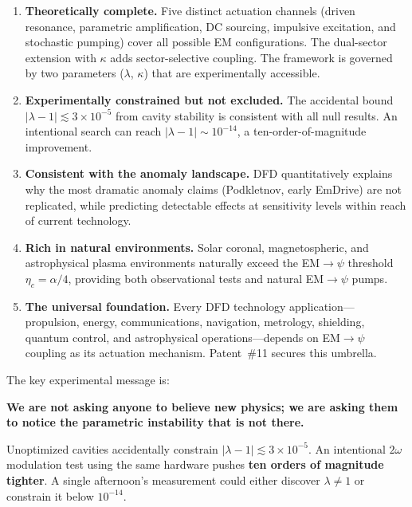 \documentclass[aps,prd,twocolumn,superscriptaddress,floatfix,nofootinbib]{revtex4-2}
\newcommand{\lam}{\lambda}
\begin{document}
\begin{enumerate}
\item \textbf{Theoretically complete.} Five distinct actuation
channels (driven resonance, parametric amplification, DC sourcing,
impulsive excitation, and stochastic pumping) cover all possible
EM configurations. The dual-sector extension with $\kappa$ adds
sector-selective coupling. The framework is governed by two parameters
($\lambda$, $\kappa$) that are experimentally accessible.

\item \textbf{Experimentally constrained but not excluded.} The
accidental bound $|\lam-1| \lesssim 3 \times 10^{-5}$ from cavity
stability is consistent with all null results. An intentional search
can reach $|\lam-1| \sim 10^{-14}$, a ten-order-of-magnitude
improvement.

\item \textbf{Consistent with the anomaly landscape.} DFD quantitatively
explains why the most dramatic anomaly claims (Podkletnov, early EmDrive)
are not replicated, while predicting detectable effects at sensitivity
levels within reach of current technology.

\item \textbf{Rich in natural environments.} Solar coronal,
magnetospheric, and astrophysical plasma environments naturally exceed
the EM$\to\psi$ threshold $\eta_c = \alpha/4$, providing both
observational tests and natural EM$\to\psi$ pumps.

\item \textbf{The universal foundation.} Every DFD technology
application---propulsion, energy, communications, navigation,
metrology, shielding, quantum control, and astrophysical
operations---depends on EM$\to\psi$ coupling as its actuation
mechanism. Patent~\#11 secures this umbrella.
\end{enumerate}

The key experimental message is:
\begin{tcolorbox}[colback=green!5!white, colframe=green!50!black]
\textbf{We are not asking anyone to believe new physics; we are asking
them to notice the parametric instability that is not there.}

Unoptimized cavities accidentally constrain
$|\lam-1| \lesssim 3 \times 10^{-5}$. An intentional $2\omega$
modulation test using the same hardware pushes \textbf{ten orders
of magnitude tighter}. A single afternoon's measurement could
either discover $\lam \neq 1$ or constrain it below $10^{-14}$.
\end{tcolorbox}
\end{document}
